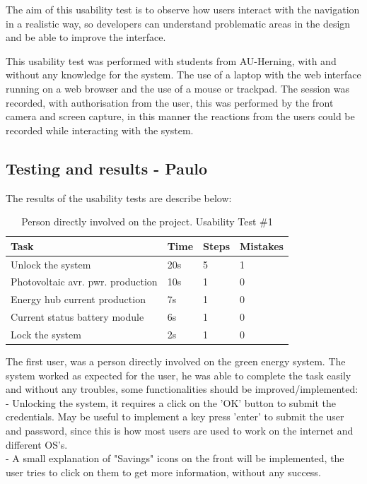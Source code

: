 The aim of this usability test is to observe how users interact with the navigation in a realistic way, so developers can understand problematic areas in the design and be able to improve the interface.

This usability test was performed with students from AU-Herning, with and without any knowledge for the system. The use of a laptop with the web interface running on a web browser and the use of a mouse or trackpad. The session was recorded, with authorisation from the user, this was performed by the front camera and screen capture, in this manner the reactions from the users could be recorded while interacting with the system.

\subsection{Testing and results - Paulo}

The results of the usability tests are describe below:

\begin{table}[H]
	\begin{tabular}{ | l | l | l | l |}
		\hline
		Task 				 	     & 		Time 	& 	Steps 	& 	Mistakes 		\\ \hline
		Unlock the system    			     & 		20s  		& 	 5 		& 	1 			\\ \hline
		Photovoltaic avr. pwr. production  & 		10s 		& 	 1 		& 	0 			\\ \hline
		Energy hub current production 	     & 		7s 		& 	 1 		& 	0			 \\ \hline
		Current status battery module 	     & 		6s 		& 	 1 		& 	0 			 \\ \hline
		Lock the system 			     & 		2s 		& 	 1 		& 	0 			 \\ \hline
	\end{tabular}
    \caption{Person directly involved on the project. Usability Test \#1}
\end{table}

The first user, was a person directly involved on the green energy system. The system worked as expected for the user, he was able to complete the task easily and without any troubles, some functionalities should be improved/implemented:\\
- Unlocking the system, it requires a click on the 'OK' button to submit the credentials. May be useful to implement a key press 'enter' to submit the user and password, since this is how most users are used to work on the internet and different OS's.\\
- A small explanation of "Savings" icons on the front will be implemented, the user tries to click on them to get more information, without any success.\\

